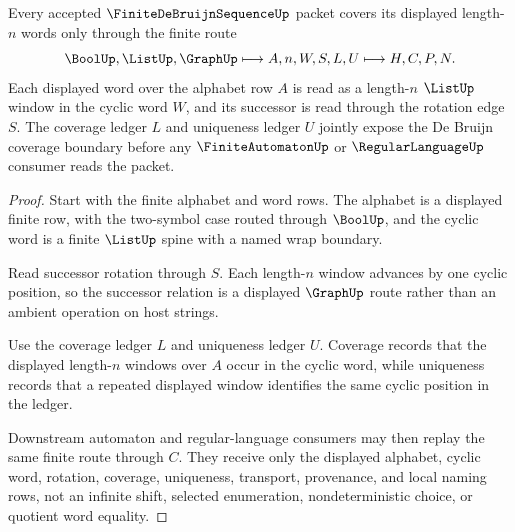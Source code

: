 \begin{theorem}
\label{thm:finite-de-bruijn-sequence-window-coverage}
Every accepted $\FiniteDeBruijnSequenceUp$ packet covers its displayed length-$n$ words only through the finite route
$$
\BoolUp,\ListUp,\GraphUp \longmapsto A,n,W,S,L,U \longmapsto H,C,P,N .
$$
Each displayed word over the alphabet row $A$ is read as a length-$n$ $\ListUp$ window in the cyclic word $W$, and its successor is read through the rotation edge $S$. The coverage ledger $L$ and uniqueness ledger $U$ jointly expose the De Bruijn coverage boundary before any $\FiniteAutomatonUp$ or $\RegularLanguageUp$ consumer reads the packet.
\end{theorem}
\begin{proof}
Start with the finite alphabet and word rows. The alphabet is a displayed finite row, with the two-symbol case routed through $\BoolUp$, and the cyclic word is a finite $\ListUp$ spine with a named wrap boundary.

Read successor rotation through $S$. Each length-$n$ window advances by one cyclic position, so the successor relation is a displayed $\GraphUp$ route rather than an ambient operation on host strings.

Use the coverage ledger $L$ and uniqueness ledger $U$. Coverage records that the displayed length-$n$ windows over $A$ occur in the cyclic word, while uniqueness records that a repeated displayed window identifies the same cyclic position in the ledger.

Downstream automaton and regular-language consumers may then replay the same finite route through $C$. They receive only the displayed alphabet, cyclic word, rotation, coverage, uniqueness, transport, provenance, and local naming rows, not an infinite shift, selected enumeration, nondeterministic choice, or quotient word equality.
\end{proof}



